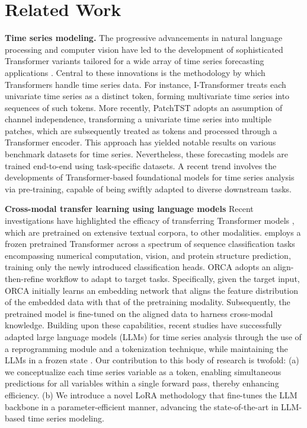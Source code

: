 \section{Related Work}
\noindent\textbf{Time series modeling.} \quad The progressive advancements in natural language processing and computer vision have led to the development of sophisticated Transformer \cite{Vaswani2017AttentionIA} variants tailored for a wide array of time series forecasting applications \cite{zhou2021informer,wu2021autoformer}. Central to these innovations is the methodology by which Transformers handle time series data. For instance, I-Transformer \cite{liu2023itransformer} treats each univariate time series as a distinct token, forming multivariate time series into sequences of such tokens. More recently, PatchTST \cite{nie2022time} adopts an assumption of channel independence, transforming a univariate time series into multiple patches, which are subsequently treated as tokens and processed through a Transformer encoder. This approach has yielded notable results on various benchmark datasets for time series. Nevertheless, these forecasting models are trained end-to-end using task-specific datasets. A recent trend involves the developments of Transformer-based foundational models for time series analysis \cite{das2023decoder,goswami2024moment} via pre-training, capable of being swiftly adapted to diverse downstream tasks.



\noindent\textbf{Cross-modal transfer learning using language models} \quad Recent investigations have highlighted the efficacy of transferring Transformer models \cite{Vaswani2017AttentionIA}, which are pretrained on extensive textual corpora, to other modalities. \cite{lu2022frozen} employs a frozen pretrained Transformer across a spectrum of sequence classification tasks encompassing numerical computation, vision, and protein structure prediction, training only the newly introduced classification heads. ORCA \cite{shen2023cross} adopts an align-then-refine workflow to adapt to target tasks. Specifically, given the target input, ORCA initially learns an embedding network that aligns the feature distribution of the embedded data with that of the pretraining modality. Subsequently, the pretrained model is fine-tuned on the aligned data to harness cross-modal knowledge. Building upon these capabilities, recent studies have successfully adapted large language models (LLMs) for time series analysis through the use of a reprogramming module and a tokenization technique, while maintaining the LLMs in a frozen state \cite{zhou2023one,jin2023time}. Our contribution to this body of research is twofold: (a) we conceptualize each time series variable as a token, enabling simultaneous predictions for all variables within a single forward pass, thereby enhancing efficiency. (b) We introduce a novel LoRA methodology that fine-tunes the LLM backbone in a parameter-efficient manner, advancing the state-of-the-art in LLM-based time series modeling.




